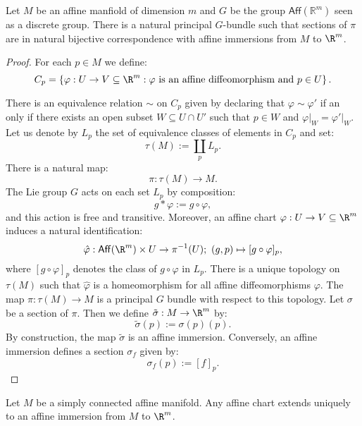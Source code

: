 \begin{theorem}
	Let $M$ be an affine manfiold of dimension $m$ and $G$ be the group $\mathsf{Aff}(\mathbb{R}^m)$ seen as a discrete group. There is a natural principal $G$-bundle  such that sections  of $\pi$ are in natural bijective correspondence with affine immersions from $M$ to $\R^m$. \end{theorem}
\begin{proof} For each $p\in M$ we define:
	\[C_{p}= \left\{  \varphi: U\to V\subseteq \R^m:  \varphi \text{ is an affine diffeomorphism and }p\in U \right\}.\]
	
	There is an equivalence relation $\sim$ on $C_p$ given by declaring that $\varphi \sim \varphi'$ if an only if there exists an open subset $W \subseteq U \cap U'$ such that $p \in W$ and $\varphi\vert_W=\varphi' \lvert_W$. Let us denote by $L_p$ the set of equivalence classes of elements in $C_p$ and set:
	\[\tau(M):=\coprod_{p} L_{p}.\]
	There is a natural map:
	\[
	\pi:\tau(M) \rightarrow M . \]
	The Lie group $G$ acts on each set $L_p$ by composition:
	\[g \ast \varphi := g \circ \varphi,\]
	and this action is free and transitive. Moreover, an affine chart $\varphi: U \rightarrow V\subseteq \R^m$ induces a natural identification:
	\[ \hat{\varphi}: \mathsf{Aff}(\R^m)\times U \rightarrow \pi^{-1}(U); \,\, (g,p)\mapsto [ g \circ \varphi]_p, \]
	where $[g \circ \varphi]_p$ denotes the class of $g \circ \varphi$ in $L_p$. There is a unique topology on $\tau(M)$ such that $\hat{\varphi}$ is a homeomorphism for all affine diffeomorphisms $\varphi$. The map $\pi: \tau(M) \rightarrow M$ is a principal $G$ bundle with respect to this topology. Let $\sigma$ be a section of $\pi$. Then we define $\tilde{\sigma}:M \rightarrow \R^m$ by:
	\[ \tilde{\sigma}(p):= \sigma(p) (p).\]
	By construction, the map $\tilde{\sigma}$ is an affine immersion. Conversely, an affine immersion  defines a section $\sigma_f$ given by:
	\[ \sigma_f(p):= [f]_p.\]
\end{proof}


\begin{corollary}\label{extend}
	Let $M$ be a simply connected affine manifold. Any affine chart  extends uniquely to an affine immersion from $M$ to $\R^m$. \end{corollary}

